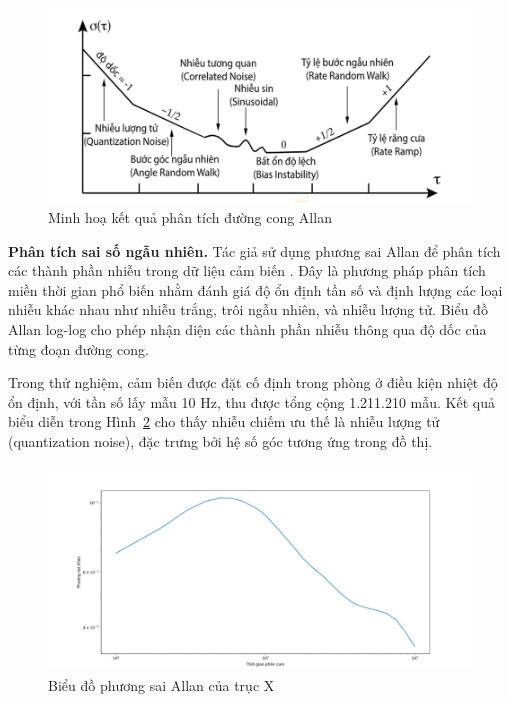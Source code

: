 \begin{figure}[htbp]
    \centering
    \includegraphics[width=\textwidth]{images/allan.png}
    \caption{Minh hoạ kết quả phân tích đường cong Allan}
    \label{allan}
\end{figure}

\textbf{Phân tích sai số ngẫu nhiên.} Tác giả sử dụng phương sai Allan 
để phân tích các thành phần nhiễu trong dữ liệu cảm biến \cite{allan}. 
Đây là phương pháp phân tích miền thời gian phổ biến nhằm đánh giá độ 
ổn định tần số và định lượng các loại nhiễu khác nhau như nhiễu trắng, 
trôi ngẫu nhiên, và nhiễu lượng tử. Biểu đồ Allan log-log cho phép nhận 
diện các thành phần nhiễu thông qua độ dốc của từng đoạn đường cong.

Trong thử nghiệm, cảm biến được đặt cố định trong phòng ở điều kiện 
nhiệt độ ổn định, với tần số lấy mẫu 10 Hz, thu được tổng cộng 1.211.210 
mẫu. Kết quả biểu diễn trong Hình~\ref{allan_real} cho thấy nhiễu chiếm 
ưu thế là nhiễu lượng tử (quantization noise), đặc trưng bởi hệ số góc 
tương ứng trong đồ thị.



\begin{figure}[htbp]
    \centering
    \includegraphics[width=\textwidth]{images/allan_real.png}
    \caption{Biểu đồ phương sai Allan của trục X}
    \label{allan_real}
\end{figure}

